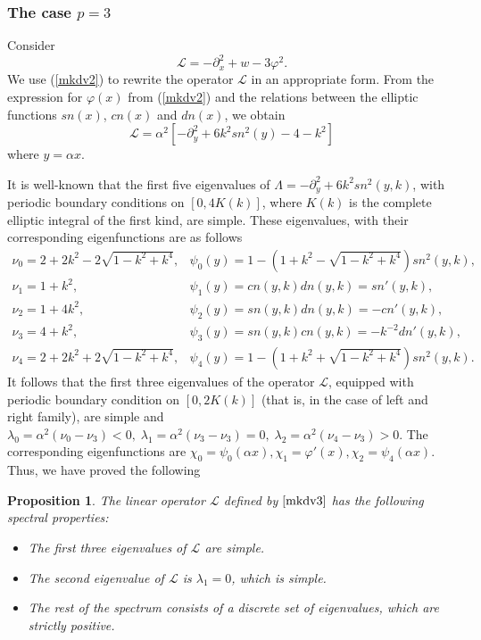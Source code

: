 \documentclass[final,11pt,leqno]{amsart}
\newtheorem{proposition}{Proposition}
\begin{document}
\subsubsection{The case $p=3$}
Consider
  \begin{equation}\label{mkdv3}
  \mathcal{L}=-\partial_x^2+w-3\varphi^2.
  \end{equation}
  We use (\eqref{mkdv2})  to
rewrite the operator $\mathcal{L}$ in an  appropriate form. From
the expression for $\varphi(x)$ from (\ref{mkdv2})
     and the relations
     between the elliptic functions $sn(x)$, $cn(x)$ and $dn(x)$, we obtain
       $$\mathcal{L}=\alpha^{2}[ -\partial_{y}^{2}+6k^{2} sn^{2}(y)-4-k^2] $$
     where $y=\alpha x$.

     It is well-known \cite{HIK}
     that the first five eigenvalues of
     $\Lambda =-\partial_{y}^{2}+6k^{2}sn^{2}(y, k)$,
     with periodic boundary conditions on $[0, 4K(k)]$, where
     $K(k)$ is the complete elliptic integral of the first kind, are
     simple. These eigenvalues, with their  corresponding eigenfunctions are as follows
      $$\begin{array}{ll}
         \nu_{0}=2+2k^2-2\sqrt{1-k^2+k^4},
         & \psi_{0}(y)=1-(1+k^2-\sqrt{1-k^{2}
         +k^{4}})sn^{2}(y, k),\\[1mm]
         \nu_{1}=1+k^{2}, & \psi_{1}(y)=cn(y, k)dn(y, k)
         =sn'(y, k),\\[1mm]
         \nu_{2}=1+4k^{2}, & \psi_{2}(y)=sn(y, k)dn(y, k)
         =-cn'(y, k),\\[1mm]
         \nu_{3}=4+k^{2}, & \psi_{3}(y)=sn(y, k)cn(y, k)
         =-k^{-2}dn'(y, k),\\[1mm]
         \nu_{4}=2+2k^{2}+2\sqrt{1-k^{2}+k^{4}},
         & \psi_{4}(y)=1-(1+k^{2}+\sqrt{1-k^{2}
         +k^{4}})sn^{2}(y, k).
        \end{array}
      $$
      It follows that the first three eigenvalues of the operator
      $\mathcal{L}$, equipped with periodic boundary condition on $[0,2K(k)]$
      (that is, in the case of left and right family),
      are simple and $\lambda_0=\alpha^2(\nu_0-\nu_3)<0, \;
      \lambda_1=\alpha^2(\nu_3-\nu_3)=0, \;
      \lambda_{2}=\alpha^2(\nu_4-\nu_3)>0$.
The corresponding eigenfunctions are $\chi_0=\psi_0(\alpha x),
\chi_1=\varphi'(x), \chi_2=\psi_4(\alpha x)$.
Thus, we have proved the following
\begin{proposition}
\label{prop:3}
 The linear
operator ${\mathcal L}$ defined by $\eqref{mkdv3}$ has the following
spectral properties:
\begin{itemize}
\item[(i)]
  The first three eigenvalues of
${\mathcal L}$ are simple. \\
\item[(ii)] \it The second eigenvalue of ${\mathcal L}$
is ${\lambda}_1=0$, which is simple. \\
\item[(iii)] The rest of the spectrum   consists of a  discrete
set of eigenvalues, which are strictly positive.
\end{itemize}
\end{proposition}
\end{document}
